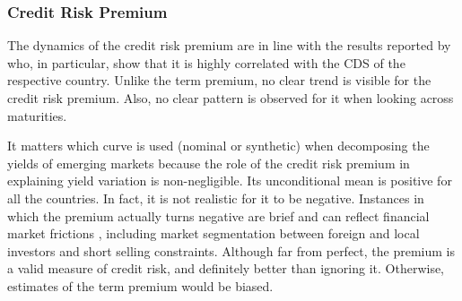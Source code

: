 {%


\subsubsection{Credit Risk Premium}
\iftoggle{toclinks}{\gototoc}{} %

The dynamics of the credit risk premium are in line with the results reported by \cite{DuSchreger:2016JoF} who, in particular, show that it is highly correlated with the CDS of the respective country.
Unlike the term premium, no clear trend is visible for the credit risk premium.
Also, no clear pattern is observed for it when looking across maturities.

It matters which curve is used (nominal or synthetic) when decomposing the yields of emerging markets because the role of the credit risk premium in explaining yield variation is non-negligible.
Its unconditional mean is positive for all the countries. 
In fact, it is not realistic for it to be negative. 
Instances in which the premium actually turns negative are brief and can reflect financial market frictions \citep{DuSchreger:2016JoF}, including market segmentation between foreign and local investors and short selling constraints.
Although far from perfect, the premium is a valid measure of credit risk, and definitely better than ignoring it. 
Otherwise, estimates of the term premium would be biased. 

}
